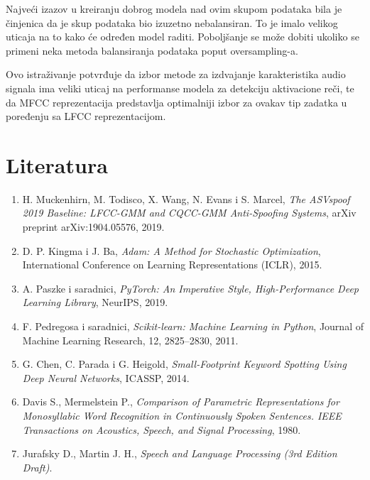 \documentclass[a4paper,12pt]{article}
\begin{document}
Najveći izazov u kreiranju dobrog modela nad ovim skupom podataka bila je činjenica da je skup podataka bio izuzetno nebalansiran. To je imalo velikog uticaja na to kako će određen model raditi. Poboljšanje se može dobiti ukoliko se primeni neka metoda balansiranja podataka poput oversampling-a.

Ovo istraživanje potvrđuje da izbor metode za izdvajanje karakteristika audio signala ima veliki uticaj na performanse modela za detekciju aktivacione reči, te da MFCC reprezentacija predstavlja optimalniji izbor za ovakav tip zadatka u poređenju sa LFCC reprezentacijom.

\newpage
\section{Literatura}

\begin{enumerate}
	
	\item H. Muckenhirn, M. Todisco, X. Wang, N. Evans i S. Marcel,
	\textit{The ASVspoof 2019 Baseline: LFCC-GMM and CQCC-GMM Anti-Spoofing Systems},
	arXiv preprint arXiv:1904.05576, 2019.
	
	\item D. P. Kingma i J. Ba,
	\textit{Adam: A Method for Stochastic Optimization},
	International Conference on Learning Representations (ICLR), 2015.
	
	\item A. Paszke i saradnici,
	\textit{PyTorch: An Imperative Style, High-Performance Deep Learning Library},
	NeurIPS, 2019.
	
	\item F. Pedregosa i saradnici,
	\textit{Scikit-learn: Machine Learning in Python},
	Journal of Machine Learning Research, 12, 2825--2830, 2011.
	
	\item G. Chen, C. Parada i G. Heigold,
	\textit{Small-Footprint Keyword Spotting Using Deep Neural Networks},
	ICASSP, 2014.

        \item Davis S., Mermelstein P.,
	\textit{Comparison of Parametric Representations for Monosyllabic Word Recognition in Continuously Spoken Sentences.
IEEE Transactions on Acoustics, Speech, and Signal Processing},
	1980.

    \item Jurafsky D., Martin J. H.,
	\textit{Speech and Language Processing (3rd Edition Draft)}.
	
\end{enumerate}
\end{document}

